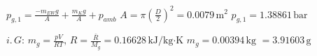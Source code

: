 \( p_{g,1} = \frac{-m_{EW} g}{A} + \frac{m_K g}{A} + p_{amb} \)  
\( A = \pi \left( \frac{D}{2} \right)^2 = 0.0079 \, \text{m}^2 \)  
\( p_{g,1} = 1.38861 \, \text{bar} \)  

\( i. \, G: \, m_g = \frac{p V}{R T}, \, R = \frac{\bar{R}}{M_g} = 0.16628 \, \text{kJ/kg·K} \)  
\( m_g = 0.00394 \, \text{kg} \)  
\( = 3.91603 \, \text{g} \)